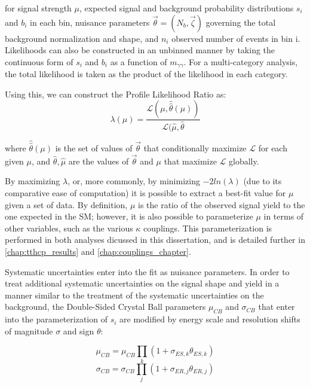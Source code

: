 for signal strength $\mu$, expected signal and background probability distributions $s_{i}$ and $b_{i}$ in each bin, nuisance parameters $\vec{\theta} = (N_{b}, \vec{\zeta})$ governing the total background normalization and shape, and $n_{i}$ observed number of events in bin i. Likelihoods can also be constructed in an unbinned manner by taking the continuous form of $s_{i}$ and $b_{i}$ as a function of $m_{\gamma\gamma}$. For a multi-category analysis, the total likelihood is taken as the product of the likelihood in each category.

Using this, we can construct the Profile Likelihood Ratio as: 
\begin{equation}
\lambda(\mu) = \frac{\mathcal{L}(\mu, \hat{\hat{\theta}}(\mu))} {\mathcal{L}(\hat{\mu}, \hat{\theta}}
\end{equation}

where $\hat{\hat{\theta}}(\mu)$ is the set of values of $\vec{\theta}$ that conditionally maximize $\mathcal{L}$ for each given $\mu$, and $\hat{\theta}, \hat{\mu}$ are the values of $\vec{\theta}$ and $\mu$ that maximize $\mathcal{L}$ globally.

By maximizing $\lambda$, or, more commonly, by minimizing $-2ln(\lambda)$ (due to its comparative ease of computation) it is possible to extract a best-fit value for $\mu$ given a set of data. By definition, $\mu$ is the ratio of the observed signal yield to the one expected in the SM; however, it is also possible to parameterize $\mu$ in terms of other variables, such as the various $\kappa$ couplings. This parameterization is performed in both analyses dicussed in this dissertation, and is detailed further in \ref{chap:tthcp_results} and \ref{chap:couplings_chapter}.

Systematic uncertainties enter into the fit as nuisance parameters. In order to treat additional systematic uncertainties on the signal shape and yield in a manner similar to the treatment of the systematic uncertainties on the background, the Double-Sided Crystal Ball parameters $\mu_{CB}$ and $\sigma_{CB}$ that enter into the parameterization of $s_{i}$ are modified by energy scale and resolution shifts of magnitude $\sigma$ and sign $\theta$:

\begin{equation}
\mu_{CB} = \mu_{CB} \prod_{k} (1+\sigma_{ES,k}\theta_{ES,k}) 
\end{equation}
\begin{equation}
\sigma_{CB} = \sigma_{CB} \prod_{j} (1+\sigma_{ER,j}\theta_{ER,j}) 
\end{equation}

